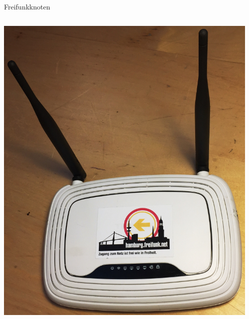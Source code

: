 \documentclass[t,aspectratio=169]{beamer}
\begin{document}
  \begin{frame}{Freifunkknoten}
        \vspace{-2em}
    \begin{columns}
      \begin{column}{0.4\textwidth}
        \begin{center}
          \includegraphics[width=\textwidth]{Bilder/841-cut}
        \end{center}
      \end{column}
      \begin{column}{0.4\textwidth}
        \begin{center}

\end{center}
\end{column}
\end{columns}
\end{frame}
\end{document}
